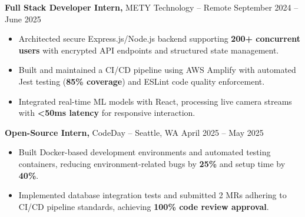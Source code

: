 \documentclass[11pt]{article}
\begin{document}
\textbf{Full Stack Developer Intern,} {METY Technology} -- Remote \hfill September 2024 -- June 2025
\vspace{-9pt}
\begin{itemize}
  \item Architected secure Express.js/Node.js backend supporting \textbf{200+ concurrent users} with encrypted API endpoints and structured state management.
  \item Built and maintained a CI/CD pipeline using AWS Amplify with automated Jest testing (\textbf{85\% coverage}) and ESLint code quality enforcement.
  \item Integrated real-time ML models with React, processing live camera streams with \textbf{<50ms latency} for responsive interaction.
\end{itemize}

\textbf{Open-Source Intern,} {CodeDay} -- Seattle, WA \hfill April 2025 -- May 2025
\vspace{-9pt}
\begin{itemize}
  \item Built Docker-based development environments and automated testing containers, reducing environment-related bugs by \textbf{25\%} and setup time by \textbf{40\%}.
  \item Implemented database integration tests and submitted 2 MRs adhering to CI/CD pipeline standards, achieving \textbf{100\% code review approval}.
\end{itemize}

\end{document}
